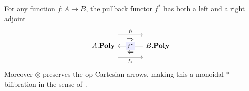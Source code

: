 \documentclass[Book-Poly]{subfiles}
\begin{document}
\begin{theorem}\label{thm.triple_adjoint_basechange}
For any function $f\colon A\to B$, the pullback functor $f^*$ has both a left and a right adjoint
\begin{equation}\label{eqn.adjoint_triple_monoidal_fib}
\begin{tikzcd}[column sep=large, background color=theoremcolor]
	\poly[A.]\ar[r, shift left=16pt, "f_!"]\ar[r, shift right=16pt, "f_*"']
	\ar[r, phantom, shift left=9pt, "\Rightarrow"]\ar[r, phantom, shift right=9pt, "\Leftarrow"]
&
	\poly[B.]\ar[l, "f^*" description]
\end{tikzcd}
\end{equation}
Moreover $\otimes$ preserves the op-Cartesian arrows, making this a monoidal $*$-bifibration in the sense of \cite[Definition 12.1]{shulman2008framed}.
\end{theorem}
\end{document}
